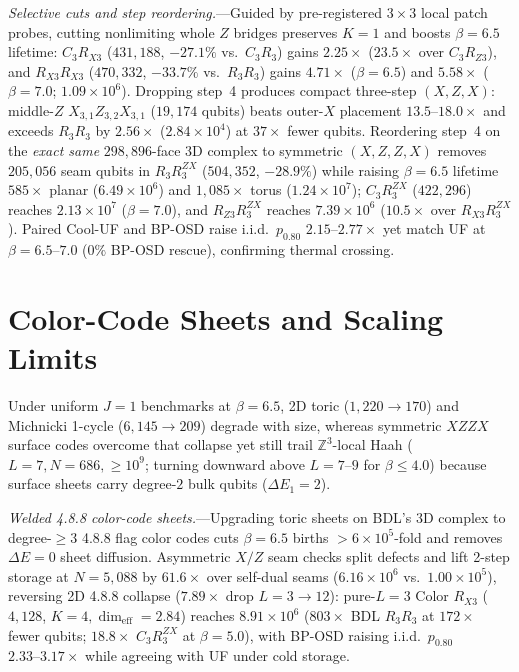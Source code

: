 \documentclass[aps,prx,reprint,superscriptaddress,nofootinbib,floatfix]{revtex4-2}
\begin{document}
\emph{Selective cuts and step reordering.}---Guided by pre-registered $3 \times 3$ local patch probes, cutting nonlimiting whole $Z$ bridges preserves $K = 1$ and boosts $\beta = 6.5$ lifetime: $C_3 R_{X3}$ ($431{,}188$, $-27.1\%$ vs.\ $C_3 R_3$) gains $2.25\times$ ($23.5\times$ over $C_3 R_{Z3}$), and $R_{X3} R_{X3}$ ($470{,}332$, $-33.7\%$ vs.\ $R_3 R_3$) gains $4.71\times$ ($\beta = 6.5$) and $5.58\times$ ($\beta = 7.0$; $1.09 \times 10^6$). Dropping step~4 produces compact three-step $(X, Z, X)$: middle-$Z$ $X_{3,1} Z_{3,2} X_{3,1}$ ($19{,}174$ qubits) beats outer-$X$ placement $13.5\text{--}18.0\times$ and exceeds $R_3 R_3$ by $2.56\times$ ($2.84 \times 10^4$) at $37\times$ fewer qubits. Reordering step~4 on the \emph{exact same} $298{,}896$-face 3D complex to symmetric $(X, Z, Z, X)$ removes $205{,}056$ seam qubits in $R_3 R_3^{ZX}$ ($504{,}352$, $-28.9\%$) while raising $\beta = 6.5$ lifetime $585\times$ planar ($6.49 \times 10^6$) and $1{,}085\times$ torus ($1.24 \times 10^7$); $C_3 R_3^{ZX}$ ($422{,}296$) reaches $2.13 \times 10^7$ ($\beta = 7.0$), and $R_{Z3} R_3^{ZX}$ reaches $7.39 \times 10^6$ ($10.5\times$ over $R_{X3} R_3^{ZX}$). Paired Cool-UF \cite{kubica_sweep2019} and BP-OSD raise i.i.d.\ $p_{0.80}$ $2.15\text{--}2.77\times$ yet match UF at $\beta = 6.5\text{--}7.0$ ($0\%$ BP-OSD rescue), confirming thermal crossing.

\section{Color-Code Sheets and Scaling Limits}

Under uniform $J = 1$ benchmarks at $\beta = 6.5$, 2D toric ($1{,}220 \to 170$) and Michnicki 1-cycle ($6{,}145 \to 209$) degrade with size, whereas symmetric $XZZX$ surface codes overcome that collapse yet still trail $\mathbb{Z}^3$-local Haah ($L = 7, N = 686, \ge 10^9$; turning downward above $L = 7\text{--}9$ for $\beta \le 4.0$) because surface sheets carry degree-$2$ bulk qubits ($\Delta E_1 = 2$).

\emph{Welded 4.8.8 color-code sheets.}---Upgrading toric sheets on BDL's 3D complex to degree-$\ge 3$ 4.8.8 flag color codes \cite{bombin2006color, kubica2015color} cuts $\beta = 6.5$ births $> 6 \times 10^5$-fold and removes $\Delta E = 0$ sheet diffusion. Asymmetric $X/Z$ seam checks split defects and lift 2-step storage at $N = 5{,}088$ by $61.6\times$ over self-dual seams ($6.16 \times 10^6$ vs.\ $1.00 \times 10^5$), reversing 2D 4.8.8 collapse ($7.89\times$ drop $L = 3 \to 12$): pure-$L = 3$ Color $R_{X3}$ ($4{,}128$, $K = 4, \dim_{\mathrm{eff}} = 2.84$) reaches $8.91 \times 10^6$ ($803\times$ BDL $R_3 R_3$ at $172\times$ fewer qubits; $18.8\times$ $C_3 R_3^{ZX}$ at $\beta = 5.0$), with BP-OSD raising i.i.d.\ $p_{0.80}$ $2.33\text{--}3.17\times$ while agreeing with UF under cold storage.
\end{document}
